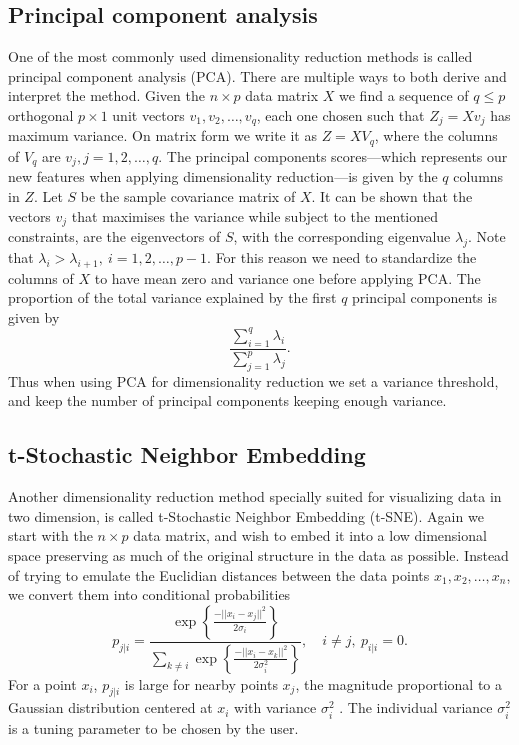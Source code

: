 \documentclass[a4paper, 10pt]{memoir}
\theoremstyle{plain}
\theoremstyle{definition}
\theoremstyle{remark}
\begin{document}
\subsection{Principal component analysis}\label{sec:pca}
One of the most commonly used dimensionality reduction methods is called principal component analysis (PCA).
There are multiple ways to both derive and interpret the method.
Given the $n \times p$ data matrix $X$ we find a sequence of $q \leq p$ orthogonal $p \times 1$ unit vectors $v_1, v_2, \hdots, v_q$, each one chosen such that $Z_j = Xv_j$ has maximum variance.
On matrix form we write it as $Z = X V_q$, where the columns of $V_q$ are $v_j, j = 1, 2, \hdots, q$. 
The principal components scores—which represents our new features when applying dimensionality reduction—is given by the $q$ columns in $Z$.
Let $S$ be the sample covariance matrix of $X$.
It can be shown \cite{jolliffe} that the vectors $v_j$ that maximises the variance while subject to the mentioned constraints, are the eigenvectors of $S$, with the corresponding eigenvalue $\lambda_j$. Note that $\lambda_i > \lambda_{i+1},\ i = 1, 2, \hdots, p-1$.
For this reason we need to standardize the columns of $X$ to have mean zero and variance one before applying PCA.
The proportion of the total variance explained by the first $q$ principal components is given by
\begin{equation*}
        \frac{\sum_{i = 1}^{q}\lambda_i}{\sum_{j = 1}^{p} \lambda_j}.
\end{equation*}
Thus when using PCA for dimensionality reduction we set a variance threshold, and keep the number of principal components keeping enough variance.



\subsection{t-Stochastic Neighbor Embedding}\label{sec:tsne}
Another dimensionality reduction method specially suited for visualizing data in two dimension, is called t-Stochastic Neighbor Embedding (t-SNE).
Again we start with the $n \times p$ data matrix, and wish to embed it into a low dimensional space preserving as much of the original structure in the data as possible.
Instead of trying to emulate the Euclidian distances between the data points $x_1, x_2, \hdots, x_n$, we convert them into conditional probabilities 
\begin{equation}\label{eq:gaus}
       p_{j|i} = \frac{\exp \left\{ \frac{-||x_i - x_j||^2}{2\sigma_i} \right\}}{\sum_{k \neq i}^{} \exp \left\{ \frac{-||x_i - x_k||^2}{2\sigma_i^2} \right\}}, \quad i \neq j, \ p_{i|i} = 0. 
\end{equation}
For a point $x_i$, $p_{j|i}$ is large for nearby points $x_j$, the magnitude proportional to a Gaussian distribution centered at $x_i$ with variance $\sigma_i^2$ \cite{hinton}.
The individual variance $\sigma_i^2$ is a tuning parameter to be chosen by the user.
\end{document}
